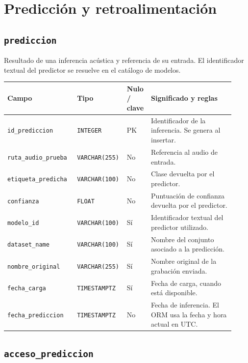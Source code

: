 \section*{Predicción y retroalimentación}

\subsection*{\texttt{prediccion}}

Resultado de una inferencia acústica y referencia de su entrada. El identificador textual del predictor se resuelve en el catálogo de modelos.

\noindent
\begin{tabular}{@{}p{0.30\linewidth}p{0.16\linewidth}p{0.10\linewidth}p{0.36\linewidth}@{}}
\hline
\textbf{Campo} & \textbf{Tipo} & \textbf{Nulo / clave} & \textbf{Significado y reglas} \\
\hline
\texttt{id\_\allowbreak{}prediccion} & \texttt{INTEGER} & PK & Identificador de la inferencia. Se genera al insertar. \\
\texttt{ruta\_\allowbreak{}audio\_\allowbreak{}prueba} & \texttt{VARCHAR(255)} & No & Referencia al audio de entrada. \\
\texttt{etiqueta\_\allowbreak{}predicha} & \texttt{VARCHAR(100)} & No & Clase devuelta por el predictor. \\
\texttt{confianza} & \texttt{FLOAT} & No & Puntuación de confianza devuelta por el predictor. \\
\texttt{modelo\_\allowbreak{}id} & \texttt{VARCHAR(100)} & Sí & Identificador textual del predictor utilizado. \\
\texttt{dataset\_\allowbreak{}name} & \texttt{VARCHAR(100)} & Sí & Nombre del conjunto asociado a la predicción. \\
\texttt{nombre\_\allowbreak{}original} & \texttt{VARCHAR(255)} & Sí & Nombre original de la grabación enviada. \\
\texttt{fecha\_\allowbreak{}carga} & \texttt{TIMESTAMPTZ} & Sí & Fecha de carga, cuando está disponible. \\
\texttt{fecha\_\allowbreak{}prediccion} & \texttt{TIMESTAMPTZ} & No & Fecha de inferencia. El ORM usa la fecha y hora actual en UTC. \\
\hline
\end{tabular}

\subsection*{\texttt{acceso\_\allowbreak{}prediccion}}

